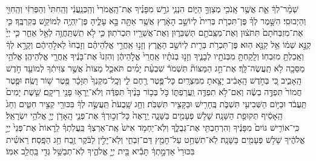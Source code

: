 \documentclass[twoside, openany, parskip=half, 11pt]{book}
\begin{document}
\begin{footnotesize}
\begin{multicols}{2}
שְׁמָ֨ר־לְךָ֔ אֵ֛ת אֲשֶׁ֥ר אָֽנֹכִ֖י מְצַוְּךָ֣ הַיּ֑וֹם הִנְנִ֧י גֹרֵ֣שׁ מִפָּנֶ֗יךָ אֶת־הָֽאֱמֹרִי֙ וְהַֽכְּנַֽעֲנִ֔י וְהַֽחִתִּי֙ וְהַפְּרִזִּ֔י וְהַֽחִוִּ֖י וְהַיְבוּסִֽי׃ הִשָּׁ֣מֶר לְךָ֗ פֶּן־תִּכְרֹ֤ת בְּרִית֙ לְיוֹשֵׁ֣ב הָאָ֔רֶץ אֲשֶׁ֥ר אַתָּ֖ה בָּ֣א עָלֶ֑יהָ פֶּן־יִֽהְיֶ֥ה לְמוֹקֵ֖שׁ בְּקִרְבֶּֽךָ׃ כִּ֤י אֶת־מִזְבְּחֹתָם֙ תִּתֹּצ֔וּן וְאֶת־מַצֵּֽבֹתָ֖ם תְּשַׁבֵּר֑וּן וְאֶת־אֲשֵׁרָ֖יו תִּכְרֹתֽוּן׃ כִּ֛י לֹ֥א תִֽשְׁתַּֽחֲוֶ֖ה לְאֵ֣ל אַחֵ֑ר כִּ֤י יְיָ֙ קַנָּ֣א שְׁמ֔וֹ אֵ֥ל קַנָּ֖א הֽוּא׃ פֶּן־תִּכְרֹ֥ת בְּרִ֖ית לְיוֹשֵׁ֣ב הָאָ֑רֶץ וְזָנ֣וּ אַֽחֲרֵ֣י אֱלֹֽהֵיהֶ֗ם וְזָבְחוּ֙ לֵאלֹ֣הֵיהֶ֔ם וְקָרָ֣א לְךָ֔ וְאָֽכַלְתָּ֖ מִזִּבְחֽוֹ׃ וְלָֽקַחְתָּ֥ מִבְּנֹתָ֖יו לְבָנֶ֑יךָ וְזָנ֣וּ בְנֹתָ֗יו אַֽחֲרֵי֙ אֱלֹ֣הֵיהֶ֔ן וְהִזְנוּ֙ אֶת־בָּנֶ֔יךָ אַֽחֲרֵ֖י אֱלֹֽהֵיהֶֽן׃ אֱלֹהֵ֥י מַסֵּכָ֖ה לֹ֥א תַֽעֲשֶׂה־לָּֽךְ׃  אֶת־חַ֣ג הַמַּצּוֹת֘ תִּשְׁמֹר֒ שִׁבְעַ֨ת יָמִ֜ים תֹּאכַ֤ל מַצּוֹת֙ אֲשֶׁ֣ר צִוִּיתִ֔ךָ לְמוֹעֵ֖ד חֹ֣דֶשׁ הָֽאָבִ֑יב כִּ֚י בְּחֹ֣דֶשׁ הָֽאָבִ֔יב יָצָ֖אתָ מִמִּצְרָֽיִם׃ כָּל־פֶּ֥טֶר רֶ֖חֶם לִ֑י וְכָֽל־מִקְנְךָ֙ תִּזָּכָ֔ר פֶּ֖טֶר שׁ֥וֹר וָשֶֽׂה׃ וּפֶ֤טֶר חֲמוֹר֙ תִּפְדֶּ֣ה בְשֶׂ֔ה וְאִם־לֹ֥א תִפְדֶּ֖ה וַֽעֲרַפְתּ֑וֹ כֹּ֣ל בְּכ֤וֹר בָּנֶ֨יךָ֙ תִּפְדֶּ֔ה וְלֹא־יֵֽרָא֥וּ פָנַ֖י רֵיקָֽם׃ שֵׁ֤שֶׁת יָמִים֙ תַּֽעֲבֹ֔ד וּבַיּ֥וֹם הַשְּׁבִיעִ֖י תִּשְׁבֹּ֑ת בֶּֽחָרִ֥ישׁ וּבַקָּצִ֖יר תִּשְׁבֹּֽת׃ וְחַ֤ג שָֽׁבֻעֹת֙ תַּֽעֲשֶׂ֣ה לְךָ֔ בִּכּוּרֵ֖י קְצִ֣יר חִטִּ֑ים וְחַג֙ הָֽאָסִ֔יף תְּקוּפַ֖ת הַשָּׁנָֽה׃ שָׁל֥שׁ פְּעָמִ֖ים בַּשָּׁנָ֑ה יֵֽרָאֶה֙ כָּל־זְכ֣וּרְךָ֔ אֶת־פְּנֵ֛י הָֽאָדֹ֥ן יְיָ֖ אֱלֹהֵ֥י יִשְׂרָאֵֽל׃ כִּֽי־אוֹרִ֤ישׁ גּוֹיִם֙ מִפָּנֶ֔יךָ וְהִרְחַבְתִּ֖י אֶת־גְּבֻלֶ֑ךָ וְלֹֽא־יַחְמֹ֥ד אִישׁ֙ אֶֽת־אַרְצְךָ֔ בַּֽעֲלֹֽתְךָ֗ לֵֽרָאוֹת֙ אֶת־פְּנֵי֙ יְיָ֣ אֱלֹהֶ֔יךָ שָׁל֥שׁ פְּעָמִ֖ים בַּשָּׁנָֽה׃ לֹֽא־תִשְׁחַ֥ט עַל־חָמֵ֖ץ דַּם־זִבְחִ֑י וְלֹֽא־יָלִ֣ין לַבֹּ֔קֶר זֶ֖בַח חַ֥ג הַפָּֽסַח׃ רֵאשִׁ֗ית בִּכּוּרֵי֙ אַדְמָ֣תְךָ֔ תָּבִ֕יא בֵּ֖ית יְיָ֣ אֱלֹהֶ֑יךָ לֹֽא־תְבַשֵּׁ֥ל גְּדִ֖י בַּֽחֲלֵ֥ב אִמּֽוֹ׃



\end{multicols}
\end{footnotesize}
\end{document}
